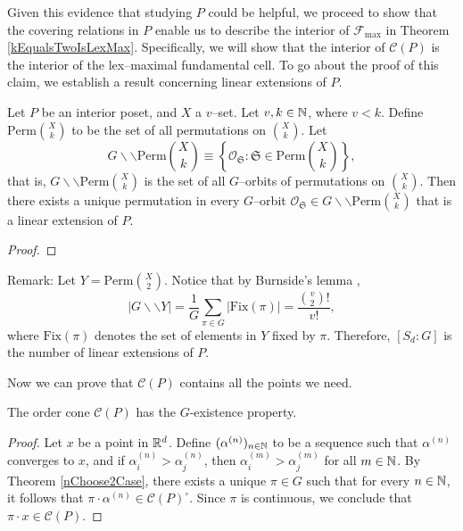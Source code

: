 Given this evidence that studying $P$ could be helpful, we proceed to show that the covering relations in $P$ enable us to describe the interior of $\mathcal{F}_{\max}$ in Theorem \ref{kEqualsTwoIsLexMax}. Specifically, we will show that the interior of $\mathcal{C}(P)$ is the interior of the lex--maximal fundamental cell. To go about the proof of this claim, we establish a result concerning linear extensions of $P$.

\begin{thm}\label{nChoose2Case}
Let $P$ be an interior poset, and $X$ a $v$--set. Let $v, k \in \mathbb{N}$, where $v < k$. Define $\mathrm{Perm}\binom{X}{k}$ to be the set of all permutations on $\binom{X}{k}$. Let \[G \backslash \backslash \mathrm{Perm}\binom{X}{k} \equiv \left\{\mathcal{O}_{\mathfrak{S}} : \mathfrak{S}\in\mathrm{Perm}\binom{X}{k}\right\},\] that is, $G\backslash\backslash\mathrm{Perm}\binom{X}{k}$ is the set of all $G$--orbits of permutations on $\binom{X}{k}$. Then there exists a unique permutation in every $G$--orbit $\mathcal{O}_{\mathfrak{S}} \in G \backslash \backslash \mathrm{Perm}\binom{X}{k}$ that is a linear extension of $P$.
\end{thm}

\begin{proof}

\end{proof}

Remark: Let $Y = \mathrm{Perm}\binom{X}{2}$. Notice that by Burnside's lemma \cite{dummit}, \[\vert G\backslash\backslash Y\vert = \frac{1}{G}\sum_{\pi \in G} \vert \mathrm{Fix}(\pi) \vert = \frac{\binom{v}{2}!}{v!},\] where $\mathrm{Fix}(\pi)$ denotes the set of elements in $Y$ fixed by $\pi$. Therefore, $[S_d : G]$ is the number of linear extensions of $P$.

Now we can prove that $\mathcal{C}(P)$ contains all the points we need.

\begin{prop}\label{representativesInClosure}
The order cone $\mathcal{C}(P)$ has the $G$-existence property.
\end{prop}

\begin{proof}
Let $x$ be a point in $\mathbb{R}^d$. Define $(\alpha^{(n)})_{n\in\mathbb{N}}$ to be a sequence such that $\alpha^{(n)}$ converges to $x$, and if $\alpha_i^{(n)} > \alpha_j^{(n)}$, then $\alpha_i^{(m)} > \alpha_j^{(m)}$ for all $m \in \mathbb{N}$. By Theorem \ref{nChoose2Case}, there exists a unique $\pi \in G$ such that for every $n\in \mathbb{N}$, it follows that $\pi \cdot \alpha^{(n)} \in \mathcal{C}(P)^\circ$. Since $\pi$ is continuous, we conclude that $\pi \cdot x \in \mathcal{C}(P).$
\end{proof}

